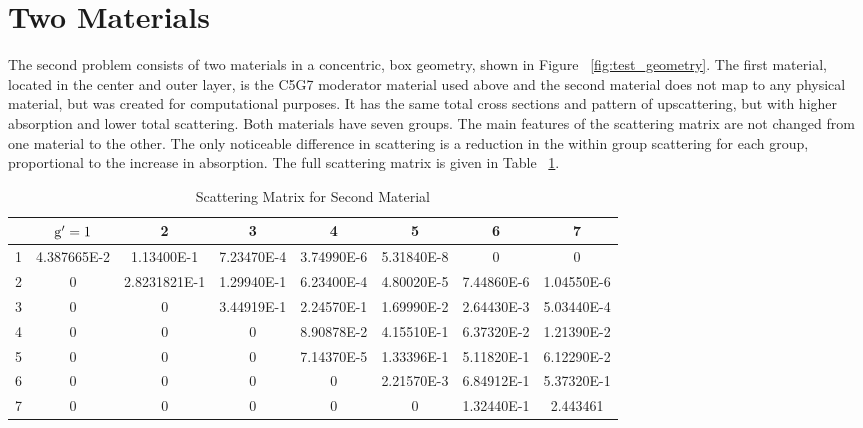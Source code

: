 \section{Two Materials}
The second problem consists of two materials in a concentric, box geometry, shown in Figure ~\ref{fig:test_geometry}. 
The first material, located in the center and outer layer, is the C5G7 moderator material used above and the second material does not map to any physical material, but was created for computational purposes. It has the same total cross sections and pattern of upscattering, but with higher absorption and lower total scattering. Both materials have seven groups. The main features of the scattering matrix are not changed from one material to the other. The only noticeable difference in scattering is a reduction in the within group scattering for each group, proportional to the increase in absorption. The full scattering matrix is given in Table ~\ref{table:mat2}.

 \begin{table}[!htb]
\footnotesize
\centering
\caption{Scattering Matrix for Second Material}
\begin{center}
    \begin{tabular}{|c|c|c|c|c|c|c|c|}
\hline
 & $\mathrm{g}'=1$ & 2 & 3 & 4 & 5 & 6 & 7 \\ 
\hline
1 & 4.387665E-2 & 1.13400E-1   &  7.23470E-4 & 3.74990E-6 & 5.31840E-8  &     0    &     0    \\
\hline
2 & 0        &    2.8231821E-1  & 1.29940E-1 & 6.23400E-4 & 4.80020E-5 & 7.44860E-6 & 1.04550E-6 \\
\hline
3 & 0       &        0    &       3.44919E-1 & 2.24570E-1 & 1.69990E-2 & 2.64430E-3 & 5.03440E-4 \\
\hline
4 & 0         &      0      &         0     &  8.90878E-2 & 4.15510E-1 & 6.37320E-2 & 1.21390E-2 \\
\hline
5 & 0     &          0       &        0   &    7.14370E-5 & 1.33396E-1 & 5.11820E-1 & 6.12290E-2 \\
\hline
6 & 0   &        0      &         0   &        0     &  2.21570E-3 & 6.84912E-1 & 5.37320E-1 \\
\hline
7 & 0      &         0        &       0    &       0    &       0    &   1.32440E-1 & 2.443461  \\
\hline
    \end{tabular}
\end{center}
\label{table:mat2}
\end{table}

